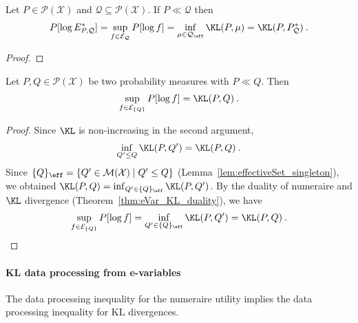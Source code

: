 \begin{theorem}\label{thm:eVar_KL_duality}
Let $P \in \mathcal{P}(\mathcal{X})$ and $\mathcal{Q} \subseteq \mathcal{P}(\mathcal{X})$.
If $P \ll \mathcal{Q}$ then
\begin{align*}
  P[\log E^*_{P, \mathcal{Q}}]
  = \sup_{f \in \mathcal{E}_{\mathcal{Q}}} P[\log f]
  = \inf_{\mu \in \mathcal{Q}_{\eff}} \KL(P, \mu)
  = \KL(P, P^*_{\mathcal{Q}})
  \: .
\end{align*}
\end{theorem}

\begin{proof}

\end{proof}


\begin{lemma}\label{lem:sup_eVar_singleton}
Let $P, Q \in \mathcal{P}(\mathcal{X})$ be two probability measures with $P \ll Q$.
Then
\begin{align*}
  \sup_{f \in \mathcal{E}_{\{Q\}}} P[\log f]
  = \KL(P, Q)
  \: .
\end{align*}
\end{lemma}

\begin{proof}
Since $\KL$ is non-increasing in the second argument,
\begin{align*}
  \inf_{Q' \le Q} \KL(P, Q') = \KL(P, Q) \: .
\end{align*}
Since $\{Q\}_{\eff} = \{Q' \in \mathcal{M}(\mathcal{X}) \mid Q' \le Q\}$ (Lemma~\ref{lem:effectiveSet_singleton}), we obtained $\KL(P, Q) = \inf_{Q' \in \{Q\}_{\eff}} \KL(P, Q')$.
By the duality of numeraire and $\KL$ divergence (Theorem~\ref{thm:eVar_KL_duality}), we have
\begin{align*}
  \sup_{f \in \mathcal{E}_{\{Q\}}} P[\log f]
  = \inf_{Q' \in \{Q\}_{\eff}} \KL(P, Q')
  = \KL(P, Q)
  \: .
\end{align*}
\end{proof}



\paragraph{KL data processing from e-variables}

The data processing inequality for the numeraire utility implies the data processing inequality for KL divergences.

